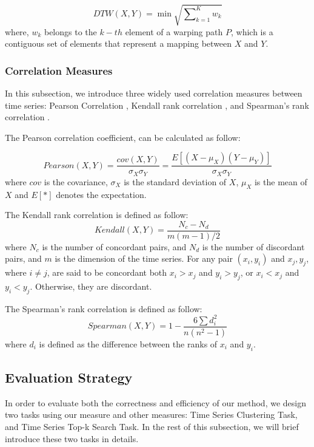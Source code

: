\begin{equation}
DTW(X,Y) = \min { \sqrt{\sum\nolimits_{k=1}^{K}w_k}}
\end{equation}
where, $w_k$ belongs to the $k-{th}$ element of a warping path $P$, which is a contiguous set of elements that represent a mapping between $X$ and $Y$.

\subsubsection{Correlation Measures}

In this subsection, we introduce three widely used correlation measures between time series: Pearson Correlation \cite{pearson1904mathematical}, Kendall rank correlation \cite{kendall1938new}, and Spearman's rank correlation \cite{pirie1988spearman}.

The Pearson correlation coefficient, can be calculated as follow:

\begin{equation*}
Pearson(X,Y)=\frac{cov(X,Y)}{\sigma_X\sigma_Y}=\frac{E[(X-\mu_X)(Y-\mu_Y)]}{\sigma_X\sigma_Y}
\end{equation*}
where $cov$ is the covariance, $\sigma_X$ is the standard deviation of $X$, $\mu_X$ is the mean of $X$ and $E[*]$ denotes the expectation.

The Kendall rank correlation \cite{kendall1938new} is defined as follow:
\begin{equation*}
Kendall(X,Y)=\frac{N_c - N_d}{m(m-1)/2}
\end{equation*}
where $N_c$ is the number of concordant pairs, and $N_d$ is the number of discordant pairs, and $m$ is the dimension of the time series.
For any pair $(x_i,y_i)$ and $x_j,y_j$, where $i \neq j$, are said to be concordant both $x_i > x_j$ and $y_i > y_j$, or $x_i < x_j$ and $y_i < y_j$. Otherwise, they are discordant.

The Spearman's rank correlation \cite{pirie1988spearman} is defined as follow:
\begin{equation*}
Spearman(X,Y)=1 - \frac{6\sum d^2_i}{n(n^2-1)}
\end{equation*}
where $d_i$ is defined as the difference between the ranks of $x_i$ and $y_i$.

\subsection{Evaluation Strategy}
In order to evaluate both the correctness and efficiency of our method, we design two tasks using our measure and other measures: Time Series Clustering Task, and Time Series Top-k Search Task. In the rest of this subsection, we will brief introduce these two tasks in details.

